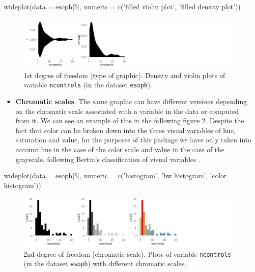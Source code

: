 \begin{example}
  wideplot(data = esoph[5], 
           numeric = c('filled violin plot', 'filled density plot'))
\end{example}


\begin{Schunk}
	\begin{figure}[H]
\includegraphics[width=1.0\linewidth]{figures/dg0-1} \caption[1st deg]{1st degree of freedom (type of graphic). Density and violin plots of variable \texttt{ncontrols} (in the dataset \texttt{esoph}).}\label{fig:dg0}
	\end{figure}
\end{Schunk}

\begin{itemize}
	\tightlist
	\item
	\textbf{Chromatic scales}. The same graphic can have different
	versions depending on the chromatic scale associated with a variable
	in the data or computed from it. We can see an example of this in the
	following figure \ref{fig:dg1}. Despite the fact that color can be
	broken down into the three visual variables of hue, saturation and
	value, for the purposes of this package we have only taken into
	account hue in the case of the color scale and value in the case of
	the grayscale, following Bertin's classification of visual variables
	\citeyearpar[p.43]{Bertin1967}.
\end{itemize}

\begin{example}
  wideplot(data = esoph[5], 
           numeric = c('histogram', 'bw histogram', 'color histogram'))
\end{example}


\begin{Schunk}
	\begin{figure}[H]
\includegraphics[width=1\linewidth]{figures/dg1-1} \caption[2nd deg]{2nd degree of freedom (chromatic scale). Plots of variable \texttt{ncontrols} (in the dataset \texttt{esoph}) with different chromatic scales.}\label{fig:dg1}
	\end{figure}
\end{Schunk}

